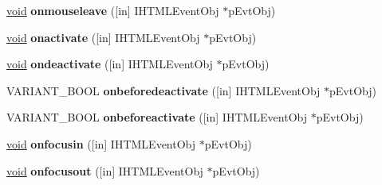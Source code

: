 \begin{DoxyCompactItemize}
\hyperlink{interfacevoid}{void} {\bfseries onmouseleave} (\mbox{[}in\mbox{]} I\+H\+T\+M\+L\+Event\+Obj $\ast$p\+Evt\+Obj)
\item 
\mbox{\label{interface_m_s_h_t_m_l_1_1_h_t_m_l_form_element_events2_a0e96d8af7703ffd90afbd438a298b8d0}} 
\hyperlink{interfacevoid}{void} {\bfseries onactivate} (\mbox{[}in\mbox{]} I\+H\+T\+M\+L\+Event\+Obj $\ast$p\+Evt\+Obj)
\item 
\mbox{\label{interface_m_s_h_t_m_l_1_1_h_t_m_l_form_element_events2_a2fd93c94eaa949114792d9810127edf3}} 
\hyperlink{interfacevoid}{void} {\bfseries ondeactivate} (\mbox{[}in\mbox{]} I\+H\+T\+M\+L\+Event\+Obj $\ast$p\+Evt\+Obj)
\item 
\mbox{\label{interface_m_s_h_t_m_l_1_1_h_t_m_l_form_element_events2_aa43ca7a1367518cd14bd33c56e9c3cdb}} 
V\+A\+R\+I\+A\+N\+T\+\_\+\+B\+O\+OL {\bfseries onbeforedeactivate} (\mbox{[}in\mbox{]} I\+H\+T\+M\+L\+Event\+Obj $\ast$p\+Evt\+Obj)
\item 
\mbox{\label{interface_m_s_h_t_m_l_1_1_h_t_m_l_form_element_events2_a479b62ef4f4263b0b0be5d94017ba08b}} 
V\+A\+R\+I\+A\+N\+T\+\_\+\+B\+O\+OL {\bfseries onbeforeactivate} (\mbox{[}in\mbox{]} I\+H\+T\+M\+L\+Event\+Obj $\ast$p\+Evt\+Obj)
\item 
\mbox{\label{interface_m_s_h_t_m_l_1_1_h_t_m_l_form_element_events2_ab2defb2ec97c70f23a3d2e17ce57409a}} 
\hyperlink{interfacevoid}{void} {\bfseries onfocusin} (\mbox{[}in\mbox{]} I\+H\+T\+M\+L\+Event\+Obj $\ast$p\+Evt\+Obj)
\item 
\mbox{\label{interface_m_s_h_t_m_l_1_1_h_t_m_l_form_element_events2_a132074eb833dbe9d20690a4169fec680}} 
\hyperlink{interfacevoid}{void} {\bfseries onfocusout} (\mbox{[}in\mbox{]} I\+H\+T\+M\+L\+Event\+Obj $\ast$p\+Evt\+Obj)
\item 
\mbox{\label{interface_m_s_h_t_m_l_1_1_h_t_m_l_form_element_events2_a3e9d05f1f162ab9d477460739235f74e}} 

\end{DoxyCompactItemize}
